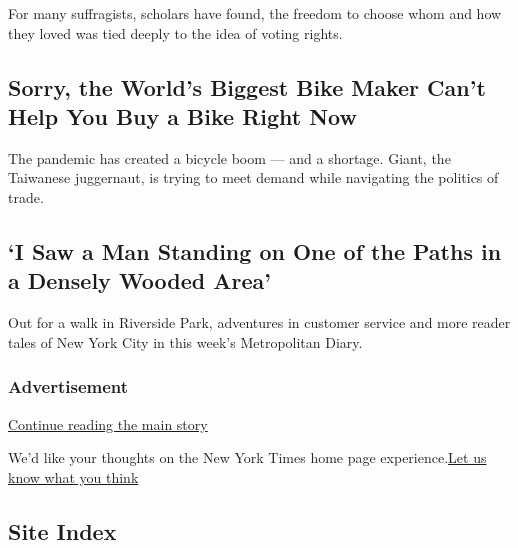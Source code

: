 For many suffragists, scholars have found, the freedom to choose whom
and how they loved was tied deeply to the idea of voting rights.

\href{/2020/08/17/business/giant-bikes-coronavirus-shortage.html}{}

\hypertarget{sorry-the-worlds-biggest-bike-maker-cant-help-you-buy-a-bike-right-now}{%
\subsection{Sorry, the World's Biggest Bike Maker Can't Help You Buy a
Bike Right
Now}\label{sorry-the-worlds-biggest-bike-maker-cant-help-you-buy-a-bike-right-now}}

The pandemic has created a bicycle boom --- and a shortage. Giant, the
Taiwanese juggernaut, is trying to meet demand while navigating the
politics of trade.

\href{/2020/08/17/business/giant-bikes-coronavirus-shortage.html}{}

\href{/2020/08/16/nyregion/metropolitan-diary.html}{}

\hypertarget{i-saw-a-man-standing-on-one-of-the-paths-in-a-densely-wooded-area}{%
\subsection{`I Saw a Man Standing on One of the Paths in a Densely
Wooded
Area'}\label{i-saw-a-man-standing-on-one-of-the-paths-in-a-densely-wooded-area}}

Out for a walk in Riverside Park, adventures in customer service and
more reader tales of New York City in this week's Metropolitan Diary.

\href{/2020/08/16/nyregion/metropolitan-diary.html}{}

\hypertarget{advertisement}{%
\subsubsection{Advertisement}\label{advertisement}}

\protect\hyperlink{after-dfp-ad-mid1-large}{Continue reading the main
story}

We'd like your thoughts on the New York Times home page
experience.\href{http://nyt.qualtrics.com/jfe/form/SV_eFJmKj9v0krSE0l}{Let
us know what you think}

\hypertarget{site-index}{%
\subsection{Site Index}\label{site-index}}

